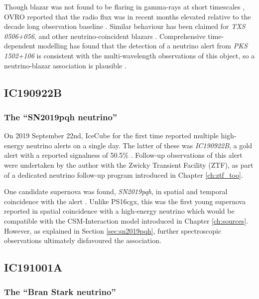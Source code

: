 Though blazar was not found to be flaring in gamma-rays at short timescales \cite{franckowiak_20}, OVRO reported that the radio flux was in recent months elevated relative to the decade long observation baseline . Similar behaviour has been claimed for \emph{TXS 0506+056}, and other neutrino-coincident blazars \cite{ovro_19}. Comprehensive time-dependent modelling has found that the detection of a neutrino alert from \emph{PKS 1502+106} is consistent with the multi-wavelength observations of this object, so a neutrino-blazar association is plausible .


\subsection{IC190922B }
\subsubsection*{The ``SN2019pqh neutrino''}

On 2019 September 22nd, IceCube for the first time reported multiple high-energy neutrino alerts on a single day. The latter of these was \emph{IC190922B}, a gold alert with a reported signalness of 50.5\% . Follow-up observations of this alert were undertaken by the author with the Zwicky Transient Facility (ZTF), as part of a dedicated neutrino follow-up program introduced in Chapter \ref{ch:ztf_too}. 

One candidate supernova was found, \emph{SN2019pqh}, in spatial and temporal coincidence with the alert . Unlike PS16cgx, this was the first young supernova reported in spatial coincidence with a high-energy neutrino which would be compatible with the CSM-Interaction model introduced in Chapter \ref{ch:sources}. However, as explained in Section \ref{sec:sn2019pqh}, further spectroscopic observations ultimately disfavoured the association. 

\subsection{IC191001A} 
\subsubsection*{The ``Bran Stark neutrino''}

